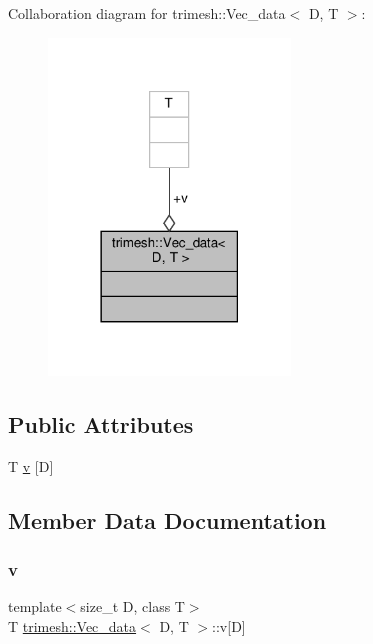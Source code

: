 Collaboration diagram for trimesh\+:\+:Vec\+\_\+data$<$ D, T $>$\+:\nopagebreak
\begin{figure}[H]
\begin{center}
\leavevmode
\includegraphics[width=182pt]{d9/dc7/structtrimesh_1_1Vec__data__coll__graph}
\end{center}
\end{figure}
\subsection*{Public Attributes}
\begin{DoxyCompactItemize}
\item 
T \hyperlink{structtrimesh_1_1Vec__data_a224d71dff348b46455353547a7315c7d}{v} \mbox{[}D\mbox{]}
\end{DoxyCompactItemize}


\subsection{Member Data Documentation}
\mbox{\label{structtrimesh_1_1Vec__data_a224d71dff348b46455353547a7315c7d}} 
\subsubsection{\texorpdfstring{v}{v}}
{\footnotesize\ttfamily template$<$size\+\_\+t D, class T$>$ \\
T \hyperlink{structtrimesh_1_1Vec__data}{trimesh\+::\+Vec\+\_\+data}$<$ D, T $>$\+::v\mbox{[}D\mbox{]}}



